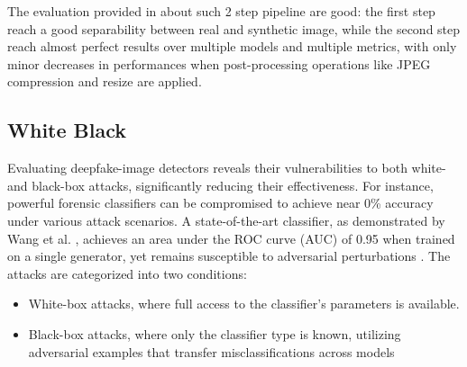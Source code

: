 \documentclass[conference]{IEEEtran} %
\begin{document}
        The evaluation provided in \cite{mandelli2022detecting} about such 2 step pipeline are good: the first step reach a good separability between real and synthetic image, while the second step reach almost perfect results over multiple models and multiple metrics, with only minor decreases in performances when post-processing operations like JPEG compression and resize are applied.

    \subsection{White Black}
        Evaluating deepfake-image detectors reveals their vulnerabilities to both white- and black-box attacks, significantly reducing their effectiveness. For instance, powerful forensic classifiers can be compromised to achieve near 0\% accuracy under various attack scenarios. A state-of-the-art classifier, as demonstrated by Wang et al. \cite{Wang_2020_CVPR}, achieves an area under the ROC curve (AUC) of 0.95 when trained on a single generator, yet remains susceptible to adversarial perturbations \cite{mardeenpaper1}.
        The attacks are categorized into two conditions:
        \begin{itemize}
            \item White-box attacks, where full access to the classifier's parameters is available.
            \item Black-box attacks, where only the classifier type is known, utilizing adversarial examples that transfer misclassifications across models
        \end{itemize}
        
\end{document}
